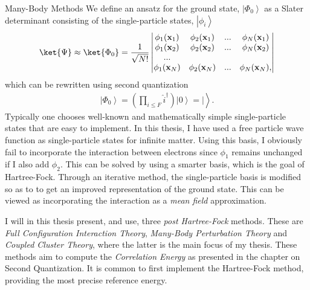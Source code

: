 \documentclass[twoside,english]{uiofysmaster}
\begin{document}
\begin{chapter}{Many-Body Methods}
	We define an ansatz for the ground state, $\left| \Phi_0 \right>$ as a Slater determinant consisting of the single-particle states, $\left| \phi_i \right>$
	\begin{align}
		\ket{\Psi} \approx \ket{\Phi_0} = 	\frac{1}{ \sqrt{N!} } \left|\begin{matrix}
			\phi_1(\mathbf{x}_1) & \phi_2(\mathbf{x}_1) & ... & \phi_N(\mathbf{x}_1) \\
			\phi_1(\mathbf{x}_2) & \phi_2(\mathbf{x}_2) & ... & \phi_N(\mathbf{x}_2) \\
			... & & & \\
			\phi_1(\mathbf{x}_N) & \phi_2(\mathbf{x}_N) & ... & \phi_N(\mathbf{x}_N),
		\end{matrix} \right|
	\end{align}
	which can be rewritten using second quantization
	\begin{align}
		\left| \Phi_0 \right> = \left( \prod_{i \leq F} \hat i^\dagger \right) \left| 0 \right> = |\left.  \right>.
	\end{align}
	Typically one chooses well-known and mathematically simple single-particle states that are easy to implement. In this thesis, I have used a free particle wave function as single-particle states for infinite matter. Using this basis, I obviously fail to incorporate the interaction between electrons since $\phi_1$ remains unchanged if I also add $\phi_2$. This can be solved by using a smarter basis, which is the goal of Hartree-Fock. Through an iterative method, the single-particle basis is modified so as to to get an improved representation of the ground state. This can be viewed as incorporating the interaction as a \textit{mean field} approximation. 

	I will in this thesis present, and use, three \textit{post Hartree-Fock} methods. These are \textit{Full Configuration Interaction Theory}, \textit{Many-Body Perturbation Theory} and \textit{Coupled Cluster Theory}, where the latter is the main focus of my thesis. These methods aim to compute the \textit{Correlation Energy} as presented in the chapter on Second Quantization. It is common to first implement the Hartree-Fock method, providing the most precise reference energy. 


\end{chapter}
\end{document}
